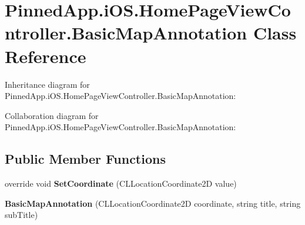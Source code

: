 \hypertarget{class_pinned_app_1_1i_o_s_1_1_home_page_view_controller_1_1_basic_map_annotation}{}\section{Pinned\+App.\+i\+O\+S.\+Home\+Page\+View\+Controller.\+Basic\+Map\+Annotation Class Reference}
\label{class_pinned_app_1_1i_o_s_1_1_home_page_view_controller_1_1_basic_map_annotation}


Inheritance diagram for Pinned\+App.\+i\+O\+S.\+Home\+Page\+View\+Controller.\+Basic\+Map\+Annotation\+:


Collaboration diagram for Pinned\+App.\+i\+O\+S.\+Home\+Page\+View\+Controller.\+Basic\+Map\+Annotation\+:
\subsection*{Public Member Functions}
\begin{DoxyCompactItemize}
\item 
\mbox{\label{class_pinned_app_1_1i_o_s_1_1_home_page_view_controller_1_1_basic_map_annotation_aa7d7b520ede7e91219c18b103d856641}} 
override void {\bfseries Set\+Coordinate} (C\+L\+Location\+Coordinate2D value)
\item 
\mbox{\label{class_pinned_app_1_1i_o_s_1_1_home_page_view_controller_1_1_basic_map_annotation_a761f5d82e76b76e5b291331eeb6b2309}} 
{\bfseries Basic\+Map\+Annotation} (C\+L\+Location\+Coordinate2D coordinate, string title, string sub\+Title)
\end{DoxyCompactItemize}
